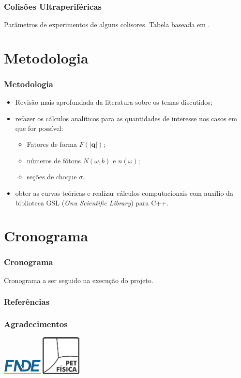 \documentclass[xcolor=dvipsnames]{beamer}
\renewcommand{\vec}{\mathbf}
\begin{document}
\begin{frame}
	\frametitle{Colisões Ultraperiféricas}
	\begin{table}
		
		\caption{Parâmetros de experimentos de alguns colisores. Tabela baseada
		em \cite{Workman2022ynf}.}
	\end{table}
\end{frame}

\section{Metodologia}
\begin{frame}
	\frametitle{Metodologia}
	\begin{itemize}
		\item Revisão mais aprofundada da literatura sobre os temas discutidos;
		\item refazer os cálculos analíticos para as quantidades de interesse
			nos casos em que for possível:
			\begin{itemize}
				\item Fatores de forma $F(|\vec{q}|)$;
				\item números de fótons $N(\omega ,b)$ e $n(\omega)$;
				\item seções de choque $\sigma$.
			\end{itemize}
		\item obter as curvas teóricas e realizar cálculos computacionais com
			auxílio da biblioteca GSL (\textit{Gnu Scientific Library}) para
			C++.
	\end{itemize}
\end{frame}

\section{Cronograma}
\begin{frame}
	\frametitle{Cronograma}
	{ \small
	\begin{table}
		
		\caption{Cronograma a ser seguido na execução do projeto.}
	\end{table}
	}
\end{frame}

\begin{frame}[allowframebreaks]
	\frametitle{Referências}
	
	  
\end{frame}

\begin{frame}
	\frametitle{Agradecimentos}
	\begin{center}
		\includegraphics[width=2cm]{./logos/logoFNDE.png}
		\hspace{2cm}
		\includegraphics[width=2cm]{./logos/logoPET.png}
	\end{center}
\end{frame}
\end{document}
